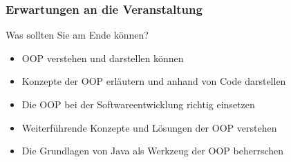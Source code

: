 \begin{frame}
\frametitle{Erwartungen an die Veranstaltung}
	\begin{block}{Was sollten Sie am Ende k\"onnen?}
		\begin{itemize}
			 \item{OOP verstehen und darstellen k\"onnen}
			 \item{Konzepte der OOP erl\"autern und anhand von Code darstellen}
			 \item{Die OOP bei der Softwareentwicklung richtig einsetzen}
			 \item{Weiterf\"uhrende Konzepte und L\"osungen der OOP verstehen}
			 \item{Die Grundlagen von Java als Werkzeug der OOP beherrschen}
		\end{itemize}
	\end{block}
\end{frame}

